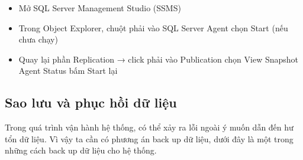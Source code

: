 \documentclass[a4paper,12pt]{report}
\begin{document}
\begin{minipage}[t]{\linewidth}
\begin{enumerate}[label=B\arabic*:]
              \begin{itemize}
                  \item Mở SQL Server Management Studio (SSMS)
                  \item Trong Object Explorer, chuột phải vào SQL Server Agent \textrightarrow{} chọn Start (nếu chưa chạy)
                  \item Quay lại phần Replication → click phải vào Publication \textrightarrow{} chọn View Snapshot Agent Status \textrightarrow{} bấm Start lại
              \end{itemize}
    \end{enumerate}
\end{minipage}
\subsection{Sao lưu và phục hồi dữ liệu}
\quad Trong quá trình vận hành hệ thống, có thể xảy ra lỗi ngoài ý muốn dẫn đến hư tổn dữ liệu. Vì vậy ta cần có phương án back up dữ liệu, dưới đây là một trong những cách back up dữ liệu cho hệ thống.
\end{document}
